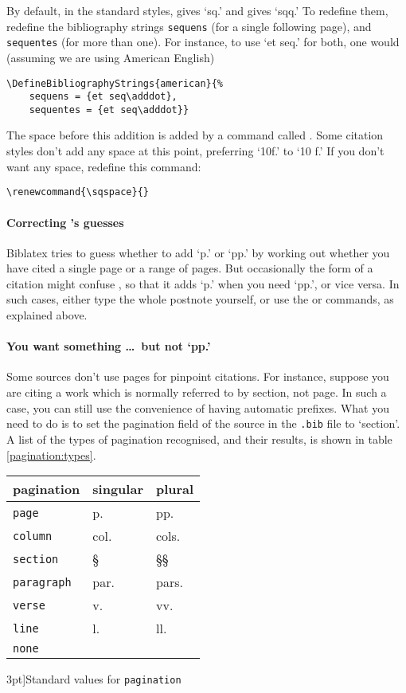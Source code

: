 By default, in the standard styles,  gives `sq.' and 
gives `sqq.' To redefine them, redefine the bibliography strings
\verb|sequens| (for a single following page), and \verb|sequentes|
(for more than one). For instance, to use `et seq.' for both, one
would (assuming we are using American English)
\begin{verbatim}
\DefineBibliographyStrings{american}{%
    sequens = {et seq\adddot},
    sequentes = {et seq\adddot}}
\end{verbatim}
The space before this addition is added by a command called
. Some citation styles don't add any space at this point,
preferring `10f.' to `10 f.' If you don't want any space, redefine
this command:
\begin{center}
\verb|\renewcommand{\sqspace}{}|
\end{center}

\paragraph{Correcting \biblatex's guesses} \textsf{Biblatex} tries to
guess whether to add `p.' or `pp.' by working out whether you have
cited a single page or a range of pages. But occasionally the form of a
citation might confuse \biblatex, so that it adds `p.' when you need
`pp.', or vice versa. In such cases, either type the whole postnote
yourself, or use the  or  commands, as explained above.

\paragraph{You want something \ldots\ but not `pp.'} Some sources
don't use pages for pinpoint citations. For instance, suppose you
are citing a work which is normally referred to by section, not
page. In such a case, you can still use the convenience of having
automatic prefixes. What you need to do is to set the pagination field
of the source in the \texttt{.bib} file to `section'. A list of the
types of pagination recognised, and their results, is shown in table \ref{pagination:types}.
\begin{margintable}
\begin{tabular}{lll}
  \toprule
  \textsf{pagination} & \textsf{singular} & \textsf{plural} \\
  \midrule
  \texttt{page} & p. & pp. \\
  \texttt{column} & col. & cols. \\
  \texttt{section} & \S & \S\S \\
  \texttt{paragraph} & par. & pars. \\
  \texttt{verse} & v. & vv. \\
  \texttt{line} & l. & ll. \\
  \texttt{none} \\
  \bottomrule
\end{tabular}
\caption[][3pt]{Standard values for \texttt{pagination}\label{pagination:types}}
\end{margintable}


